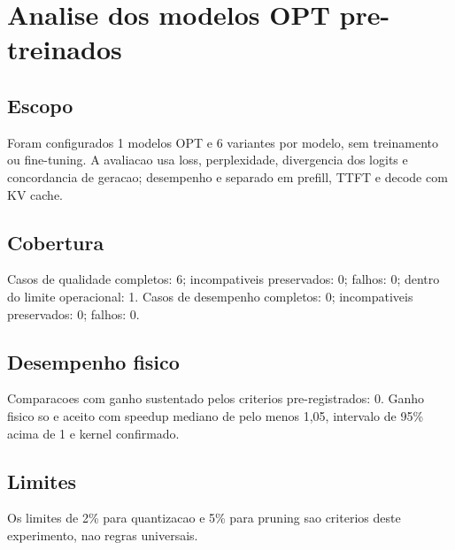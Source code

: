 \chapter{Analise dos modelos OPT pre-treinados}
\section{Escopo}
Foram configurados 1 modelos OPT e 6 variantes por modelo, sem treinamento ou fine-tuning.
A avaliacao usa loss, perplexidade, divergencia dos logits e concordancia de geracao; desempenho e separado em prefill, TTFT e decode com KV cache.
\section{Cobertura}
Casos de qualidade completos: 6; incompativeis preservados: 0; falhos: 0; dentro do limite operacional: 1.
Casos de desempenho completos: 0; incompativeis preservados: 0; falhos: 0.
\section{Desempenho fisico}
Comparacoes com ganho sustentado pelos criterios pre-registrados: 0.
Ganho fisico so e aceito com speedup mediano de pelo menos 1,05, intervalo de 95\% acima de 1 e kernel confirmado.
\section{Limites}
Os limites de 2\% para quantizacao e 5\% para pruning sao criterios deste experimento, nao regras universais.
